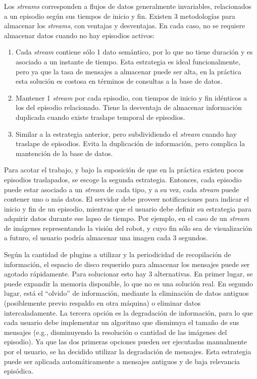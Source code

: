 Los \textit{streams} corresponden a flujos de datos generalmente invariables, relacionados a un episodio según sus tiempos de inicio y fin. Existen 3 metodologías para almacenar los \textit{streams}, con ventajas y desventajas. En cada caso, no se requiere almacenar datos cuando no hay episodios activos:
\begin{enumerate}
	\item Cada \textit{stream} contiene sólo 1 dato semántico, por lo que no tiene duración y es asociado a un instante de tiempo. Esta estrategia es ideal funcionalmente, pero ya que la tasa de mensajes a almacenar puede ser alta, en la práctica esta solución es costosa en términos de consultas a la base de datos.
	\item Mantener 1 \textit{stream} por cada episodio, con tiempos de inicio y fin idénticos a los del episodio relacionado. Tiene la desventaja de almacenar información duplicada cuando existe traslape temporal de episodios.
	\item Similar a la estrategia anterior, pero subdividiendo el \textit{stream} cuando hay traslape de episodios. Evita la duplicación de información, pero complica la mantención de la base de datos.
\end{enumerate}

Para acotar el trabajo, y bajo la suposición de que en la práctica existen pocos episodios traslapados, se escoge la segunda estrategia. Entonces, cada episodio puede estar asociado a un \textit{stream} de cada tipo, y a su vez, cada \textit{stream} puede contener uno o más datos. El servidor debe proveer notificaciones para indicar el inicio y fin de un episodio, mientras que el usuario debe definir su estrategia para adquirir datos durante ese lapso de tiempo. Por ejemplo, en el caso de un \textit{stream} de imágenes representando la visión del robot, y cuyo fin sólo sea de visualización a futuro, el usuario podría almacenar una imagen cada 3 segundos. 

Según la cantidad de plugins a utilizar y la periodicidad de recopilación de información, el espacio de disco requerido para almacenar los mensajes puede ser agotado rápidamente. Para solucionar esto hay 3 alternativas. En primer lugar, se puede expandir la memoria disponible, lo que no es una solución real. En segundo lugar, está el ``olvido'' de información, mediante la eliminación de datos antiguos (posiblemente previo respaldo en otra máquina) o eliminar datos intercaladamente. La tercera opción es la degradación de información, para lo que cada usuario debe implementar un algoritmo que disminuya el tamaño de sus mensajes (e.g., disminuyendo la resolución o cantidad de las imágenes del episodio). Ya que las dos primeras opciones pueden ser ejecutadas manualmente por el usuario, se ha decidido utilizar la degradación de mensajes. Esta estrategia puede ser aplicada automáticamente a mensajes antiguos y de baja relevancia episódica.

